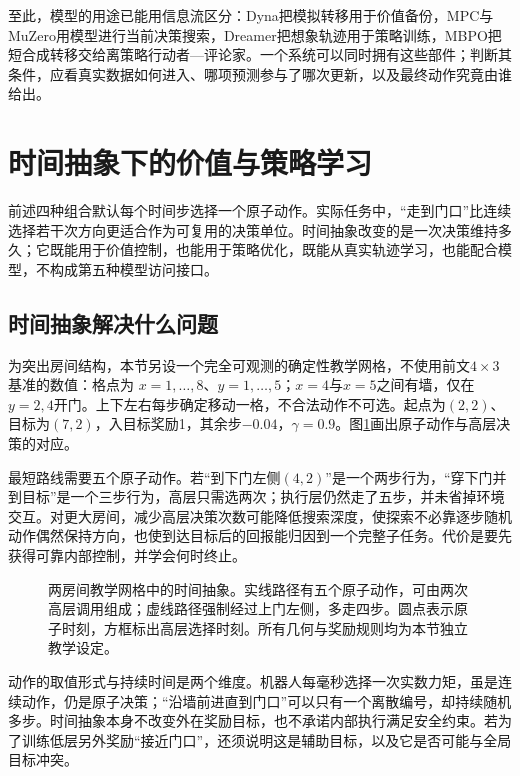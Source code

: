 至此，模型的用途已能用信息流区分：Dyna把模拟转移用于价值备份，MPC与MuZero用模型进行当前决策搜索，Dreamer把想象轨迹用于策略训练，MBPO把短合成转移交给离策略行动者—评论家。一个系统可以同时拥有这些部件；判断其条件，应看真实数据如何进入、哪项预测参与了哪次更新，以及最终动作究竟由谁给出。

\section{时间抽象下的价值与策略学习}
\label{sec:rl-learning-temporal-abstraction}

前述四种组合默认每个时间步选择一个原子动作。实际任务中，“走到门口”比连续选择若干次方向更适合作为可复用的决策单位。时间抽象改变的是一次决策维持多久；它既能用于价值控制，也能用于策略优化，既能从真实轨迹学习，也能配合模型，不构成第五种模型访问接口。

\subsection{时间抽象解决什么问题}
\label{sec:rl-learning-temporal-purpose}

为突出房间结构，本节另设一个完全可观测的确定性教学网格，不使用前文$4\times3$基准的数值：格点为
$x=1,\ldots,8$、$y=1,\ldots,5$；$x=4$与$x=5$之间有墙，仅在$y=2,4$开门。上下左右每步确定移动一格，不合法动作不可选。起点为$(2,2)$、目标为$(7,2)$，入目标奖励1，其余步$-0.04$，$\gamma=0.9$。图\ref{fig:rl-learning-options-rooms}画出原子动作与高层决策的对应。

最短路线需要五个原子动作。若“到下门左侧$(4,2)$”是一个两步行为，“穿下门并到目标”是一个三步行为，高层只需选两次；执行层仍然走了五步，并未省掉环境交互。对更大房间，减少高层决策次数可能降低搜索深度，使探索不必靠逐步随机动作偶然保持方向，也使到达目标后的回报能归因到一个完整子任务。代价是要先获得可靠内部控制，并学会何时终止。

\begin{figure}[t]
  \centering
  
  \caption{两房间教学网格中的时间抽象。实线路径有五个原子动作，可由两次高层调用组成；虚线路径强制经过上门左侧，多走四步。圆点表示原子时刻，方框标出高层选择时刻。所有几何与奖励规则均为本节独立教学设定。}
  \label{fig:rl-learning-options-rooms}
\end{figure}

动作的取值形式与持续时间是两个维度。机器人每毫秒选择一次实数力矩，虽是连续动作，仍是原子决策；“沿墙前进直到门口”可以只有一个离散编号，却持续随机多步。时间抽象本身不改变外在奖励目标，也不承诺内部执行满足安全约束。若为了训练低层另外奖励“接近门口”，还须说明这是辅助目标，以及它是否可能与全局目标冲突。

